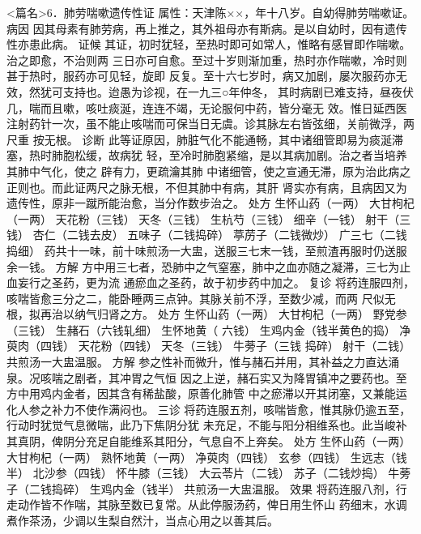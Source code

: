 \documentclass[a4paper,12pt,UTF8,twoside]{ctexbook}
\begin{document}
<篇名>6．肺劳喘嗽遗传性证
属性：天津陈××，年十八岁。自幼得肺劳喘嗽证。 
病因 因其母素有肺劳病，再上推之，其外祖母亦有斯病。是以自幼时，因有遗传性亦患此病。 
证候 其证，初时犹轻，至热时即可如常人，惟略有感冒即作喘嗽。治之即愈，不治则两 
三日亦可自愈。至过十岁则渐加重，热时亦作喘嗽，冷时则甚于热时，服药亦可见轻，旋即 
反复。至十六七岁时，病又加剧，屡次服药亦无效，然犹可支持也。迨愚为诊视，在一九三○年仲冬， 
其时病剧已难支持，昼夜伏几，喘而且嗽，咳吐痰涎，连连不竭，无论服何中药，皆分毫无 
效。惟日延西医注射药针一次，虽不能止咳喘而可保当日无虞。诊其脉左右皆弦细，关前微浮，两尺重 
按无根。 
诊断 此等证原因，肺脏气化不能通畅，其中诸细管即易为痰涎滞塞，热时肺胞松缓，故病犹 
轻，至冷时肺胞紧缩，是以其病加剧。治之者当培养其肺中气化，使之 辟有力，更疏瀹其肺 
中诸细管，使之宣通无滞，原为治此病之正则也。而此证两尺之脉无根，不但其肺中有病，其肝 
肾实亦有病，且病因又为遗传性，原非一蹴所能治愈，当分作数步治之。 
处方 生怀山药（一两） 大甘枸杞（一两） 天花粉（三钱） 天冬（三钱） 生杭芍（三钱） 
细辛（一钱） 射干（三钱） 杏仁（二钱去皮） 五味子（二钱捣碎） 葶苈子（二钱微炒） 广三七（二钱捣细） 
药共十一味，前十味煎汤一大盅，送服三七末一钱，至煎渣再服时仍送服余一钱。 
方解 方中用三七者，恐肺中之气窒塞，肺中之血亦随之凝滞，三七为止血妄行之圣药，更为流 
通瘀血之圣药，故于初步药中加之。 
复诊 将药连服四剂，咳喘皆愈三分之二，能卧睡两三点钟。其脉关前不浮，至数少减，而两 
尺似无根，拟再治以纳气归肾之方。 
处方 生怀山药（一两） 大甘枸杞（一两） 野党参（三钱） 生赭石（六钱轧细） 生怀地黄（ 
六钱） 生鸡内金（钱半黄色的捣） 净萸肉（四钱） 天花粉（四钱） 天冬（三钱） 牛蒡子（三钱 
捣碎） 射干（二钱） 
共煎汤一大盅温服。 
方解 参之性补而微升，惟与赭石并用，其补益之力直达涌泉。况咳喘之剧者，其冲胃之气恒 
因之上逆，赭石实又为降胃镇冲之要药也。至方中用鸡内金者，因其含有稀盐酸，原善化肺管 
中之瘀滞以开其闭塞，又兼能运化人参之补力不使作满闷也。 
三诊 将药连服五剂，咳喘皆愈，惟其脉仍逾五至，行动时犹觉气息微喘，此乃下焦阴分犹 
未充足，不能与阳分相维系也。此当峻补其真阴，俾阴分充足自能维系其阳分，气息自不上奔矣。 
处方 生怀山药（一两） 大甘枸杞（一两） 熟怀地黄（一两） 净萸肉（四钱） 
玄参（四钱） 生远志（钱半） 北沙参（四钱） 怀牛膝（三钱） 
大云苓片（二钱） 苏子（二钱炒捣） 牛蒡子（二钱捣碎） 生鸡内金（钱半） 
共煎汤一大盅温服。 
效果 将药连服八剂，行走动作皆不作喘，其脉至数已复常。从此停服汤药，俾日用生怀山 
药细末，水调煮作茶汤，少调以生梨自然汁，当点心用之以善其后。 
\end{document}
